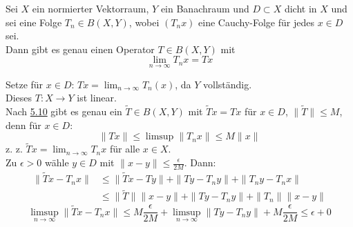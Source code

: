 \begin{kor} \label{kor:5.11}
	Sei $X$ ein normierter Vektorraum, $Y$ ein Banachraum und $D \subset X$ dicht in $X$ und sei eine Folge $T_{n} \in B(X, Y)$, wobei $(T_{n} x)$ eine Cauchy-Folge für jedes $x \in D$ sei. \\
		Dann gibt es genau einen Operator $T \in B(X, Y)$ mit
		\[ \lim_{n \rightarrow \infty} T_{n} x = T x \]
	\begin{beweis}
		Setze für $x \in D$: $Tx = \lim_{n \rightarrow \infty} T_{n}(x)$, da $Y$ vollständig. \\
		Dieses $T: X \rightarrow Y$ ist linear. \\ 
		Nach \hyperref[prop:5.10]{5.10} gibt es genau ein $\tilde T \in B(X, Y)$ mit $\tilde T x = T x$ für $x \in D$, $\| \tilde T \| \leq M$, denn für $x \in D$:
		\[ \| T x \| \leq \limsup \| T_{n} x \| \leq M \| x \| \]
		z. z. $\tilde T x = \lim_{n \rightarrow \infty} T_{n} x$ für alle $x \in X$. \\
		Zu $\epsilon > 0$ wähle $y \in D$ mit $\| x - y \| \leq \frac{\epsilon}{2 M}$. Dann:
		\begin{align*}
			\| \tilde T x - T_{n} x \| & \leq \| \tilde T x - T y \| + \| T y - T_{n} y \| +  \| T_{n} y - T_{n} x \| \\
				& \leq \| \tilde T \| \| x - y \| + \| T y - T_{n} y \| + \| T_{n} \| \| x - y\| 
		\end{align*}
		\[ \limsup_{n \rightarrow \infty}  \| \tilde T x - T_{n} x \| \leq M \frac{\epsilon}{2 M} + \limsup_{n \rightarrow \infty} \| T y - T_{n} y \| + M \frac{\epsilon}{2 M} \leq \epsilon + 0 \]
	\end{beweis}
\end{kor}


